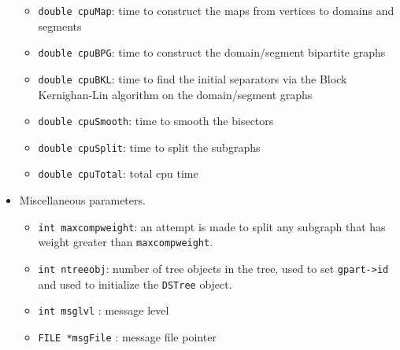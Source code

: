 \begin{itemize}
\begin{itemize}
   \item {\tt double cpuMap}: time to construct the maps from vertices
         to domains and segments
   \item {\tt double cpuBPG}: time to construct the domain/segment
         bipartite graphs
   \item {\tt double cpuBKL}: time to find the initial separators via the
         Block Kernighan-Lin algorithm on the domain/segment graphs
   \item {\tt double cpuSmooth}: time to smooth the bisectors 
   \item {\tt double cpuSplit}: time to split the subgraphs
   \item {\tt double cpuTotal}: total cpu time
   \end{itemize}
\item Miscellaneous parameters.
   \begin{itemize}
   \item {\tt int maxcompweight}: 
         an attempt is made to split any subgraph 
         that has weight greater than {\tt maxcompweight}.
   \item {\tt int ntreeobj}: number of tree objects in the tree, used
         to set {\tt gpart->id} and used to initialize the {\tt DSTree}
         object.
   \item {\tt int msglvl} : message level
   \item {\tt FILE *msgFile} : message file pointer
   \end{itemize}
\end{itemize}
